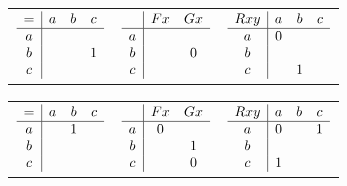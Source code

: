 \documentclass[PHIL101-Textbook.tex]{subfiles}
\begin{document}
\begin{earg}
\item \begin{tabular}{ccc}
   $\begin{array}{c|ccc}
	   = & a & b & c\\ \hline
	   a & & &\\
	   b & & &1\\
	   c & & &
	\end{array}$
	 &
   $\begin{array}{c|cc}
	  & \mathord{F}{x} & \mathord{G}{x}\\ \hline
	  a & &  \\
	  b &  & 0\\
	  c &  &
	\end{array}$
	 &
   $\begin{array}{c|ccc}
	  \mathord{R}{xy} & a & b & c\\ \hline
	  a & 0&  &  \\
	  b &  & & \\
	  c & & 1 & 
	\end{array}$
\end{tabular}\medskip\medskip
\item \begin{tabular}{ccc}
   $\begin{array}{c|ccc}
	   = & a & b & c\\ \hline
	   a & &1  &\\
	   b & & &\\
	   c & & &
	\end{array}$
	&
	$\begin{array}{c|cc}
	  & \mathord{F}{x} & \mathord{G}{x}\\ \hline
	  a & 0&  \\
	  b &  & 1\\
	  c &  & 0
	\end{array}$
	&
	$\begin{array}{c|ccc}
	  \mathord{R}{xy} & a & b & c\\ \hline
	  a & 0 &  &  1\\
	  b &  & & \\
	  c & 1 &  & 
	\end{array}$
\end{tabular}\medskip\medskip
\item {}
\end{earg}
\end{document}
